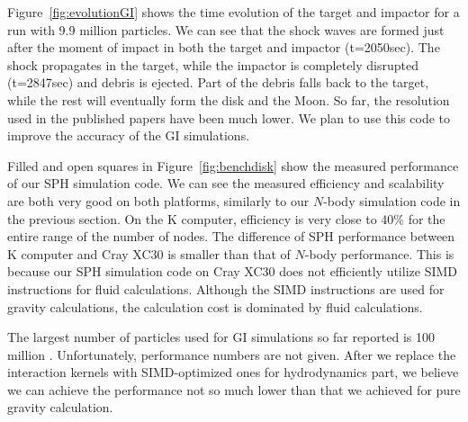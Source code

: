 Figure~\ref{fig:evolutionGI} shows the time evolution of the target
and impactor for a run with 9.9 million particles. We can see that the
shock waves are formed just after the moment of impact in both the
target and impactor (t=2050sec). The shock propagates in the target,
while the impactor is completely disrupted (t=2847sec) and debris is
ejected. Part of the debris falls back to the target, while the rest
will eventually form the disk and the Moon. So far, the resolution
used in the published papers have been much lower. We plan to use this
code to improve the accuracy of the GI simulations.

Filled and open squares in Figure~\ref{fig:benchdisk} show the
measured performance of our SPH simulation code. We can see the
measured efficiency and scalability are both very good on both
platforms, similarly to our $N$-body simulation code in the previous
section. On the K computer, efficiency is very close to 40\% for the
entire range of the number of nodes. The difference of SPH performance
between K computer and Cray XC30 is smaller than that of $N$-body
performance. This is because our SPH simulation code on Cray XC30 does
not efficiently utilize SIMD instructions for fluid
calculations. Although the SIMD instructions are used for gravity
calculations, the calculation cost is dominated by fluid calculations.

The largest number of particles used for GI simulations so far
reported is 100 million \cite{2014LPI....45.2703T}. Unfortunately,
performance numbers are not given. After we replace the interaction
kernels with SIMD-optimized ones for hydrodynamics part, we believe we
can achieve the performance not so much lower than that we achieved
for pure gravity calculation.



